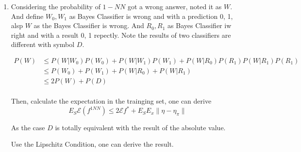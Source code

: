 \documentclass{article}
\begin{document}
\begin{enumerate}
\begin{enumerate}
\end{enumerate}



\item Considering the probability of \(1-NN\) got a wrong answer, noted it as \(W\). And define \(W_0, W_1\) as Bayes Classifier is wrong and with a prediction 0, 1, alsp \(W\) as the Bayes Classifier is wrong. And \(R_0, R_1\) as Bayes Classifier iw right and with a result 0, 1 repectly. Note the results of two classifiers are different with symbol \(D\).

\begin{align*}
    P(W) & \le P(W | W_0)P(W_0) + P(W | W_1)P(W_1) + P(W | R_0)P(R_1) P(W | R_1)P(R_1)\\
    &\le P(W_0) + P(W_1) + P(W | R_0) + P(W | R_1)\\
    &\le 2 P(W) + P(D)\\
\end{align*}

Then, calculate the expectation in the trainging set, one can derive 
\[E_S \mathcal{E}(f^{1NN}) \le 2 \mathcal E f^* + E_S E_x \|\eta - \eta_\pi\|\]

As the case \(D\) is totally equivalent with the result of the absolute value.

Use the Lipschitz Condition, one can derive the result.


\end{enumerate}
\end{document}
